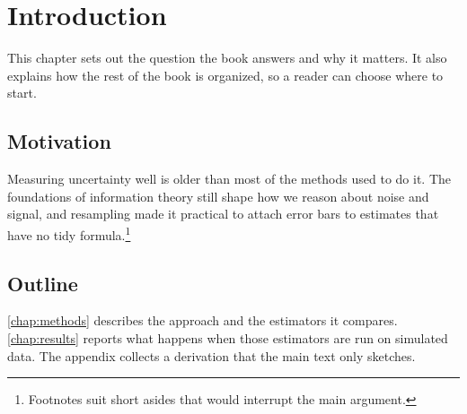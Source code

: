 \chapter{Introduction}\label{chap:introduction}

This chapter sets out the question the book answers and why it matters. It also explains how the rest of the book is organized, so a reader can choose where to start.

\section{Motivation}\label{sec:motivation}

Measuring uncertainty well is older than most of the methods used to do it. The foundations of information theory \citep{shannon1948} still shape how we reason about noise and signal, and resampling \citep{efron1979} made it practical to attach error bars to estimates that have no tidy formula.\footnote{Footnotes suit short asides that would interrupt the main argument.}

\section{Outline}\label{sec:outline}

\cref{chap:methods} describes the approach and the estimators it compares. \cref{chap:results} reports what happens when those estimators are run on simulated data. The appendix collects a derivation that the main text only sketches.
